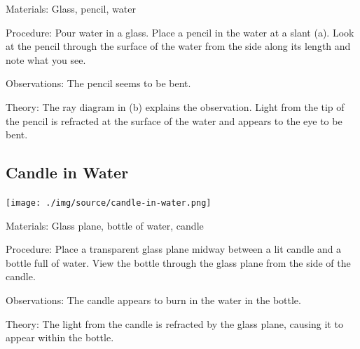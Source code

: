 \begin{multicols}{2}
\begin{description*}
\item[Materials:]{Glass, pencil, water}
\item[Procedure:]{Pour water in a glass. Place a pencil in the water at a slant (a). Look at the pencil through the surface of the water from the side along its length and note what you see.}
\item[Observations:]{The pencil seems to be bent.}
\item[Theory:]{The ray diagram in (b) explains the observation. Light from the tip of the pencil is refracted at the surface of the water and appears to the eye to be bent.}
\end{description*}

\subsection{Candle in Water}

\begin{center}
\texttt{[image: ./img/source/candle-in-water.png]}
\end{center}

\begin{description*}
\item[Materials:]{Glass plane, bottle of water, candle}
\item[Procedure:]{Place a transparent glass plane midway between a lit candle and a bottle full of water. View the bottle through the glass plane from the side of the candle.}
\item[Observations:]{The candle appears to burn in the water in the bottle.}
\item[Theory:]{The light from the candle is refracted by the glass plane, causing it to appear within the bottle.}
\end{description*}


\end{multicols}
